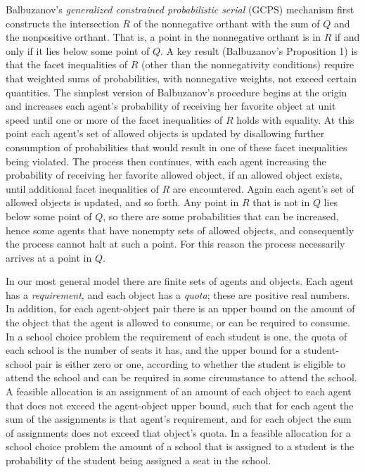 \documentclass[12pt]{article}
\theoremstyle{definition}
\begin{document}
Balbuzanov's \emph{generalized constrained probabilistic serial} (GCPS) mechanism first constructs the intersection $R$ of the nonnegative orthant with the sum of $Q$ and the nonpositive orthant.  That is, a point in the nonnegative orthant is in  $R$ if and only if it lies below some point of $Q$.  A key result (Balbuzanov's Proposition 1) is that the facet inequalities of $R$ (other than the nonnegativity conditions) require that weighted sums of probabilities, with nonnegative weights, not exceed certain quantities.
The simplest version of Balbuzanov's procedure begins at the origin and increases each agent's probability of receiving her favorite object at unit speed until one or more of the facet inequalities of $R$ holds with equality.  At this point each agent's set of allowed objects is updated by disallowing further consumption of probabilities that would result in one of these facet inequalities being violated.  The process then continues, with each agent increasing the probability of receiving her favorite allowed object, if an allowed object exists, until additional facet inequalities of $R$ are encountered. Again each agent's set of allowed objects is updated, and so forth.  Any point in $R$ that is not in $Q$ lies below some point of $Q$, so there are some probabilities that can be increased, hence some agents that have nonempty sets of allowed objects, and consequently the process cannot halt at such a point.  For this reason the process necessarily arrives at a point in $Q$.  

In our most general model there are finite sets of agents and objects.  Each agent has a \emph{requirement}, and each object has a \emph{quota}; these are  positive real numbers.  In addition, for each agent-object pair there is an upper bound on the amount of the object that the agent is allowed to consume, or can be required to consume.  In a school choice problem the requirement of each student is one, the quota of each school is the number of seats it has, and the upper bound for a student-school pair is either zero or one, according to whether the student is eligible to attend the school and can be required in some circumstance to attend the school.
A feasible allocation is an assignment of an amount of each object to each agent that does not exceed the agent-object upper bound, such that for each agent the sum of the assignments is that agent's requirement, and for each object the sum of assignments does not exceed that object's quota.  In a feasible allocation for a school choice problem the amount of a school that is assigned to a student is the probability of the student being assigned a seat in the school.
\end{document}
